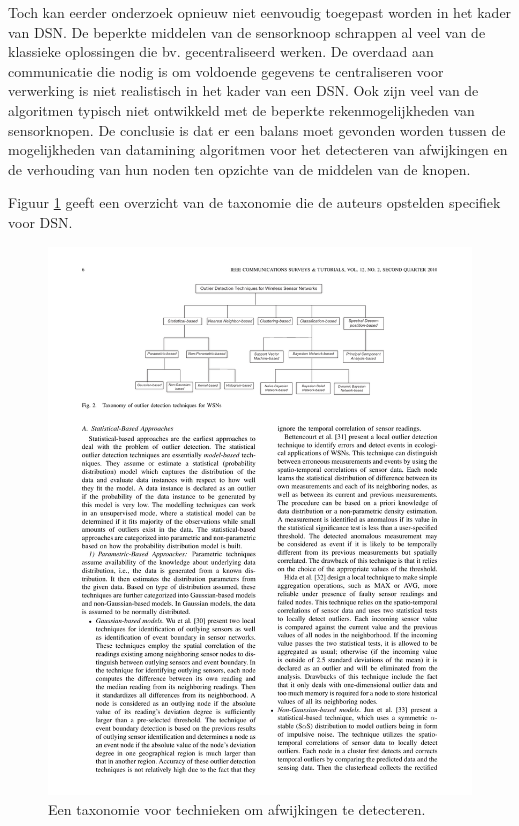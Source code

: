 Toch kan eerder onderzoek opnieuw niet eenvoudig toegepast worden in het kader
van DSN. De beperkte middelen van de sensorknoop schrappen al veel van de
klassieke oplossingen die bv. gecentraliseerd werken. De overdaad aan
communicatie die nodig is om voldoende gegevens te centraliseren voor
verwerking is niet realistisch in het kader van een DSN. Ook zijn veel van de
algoritmen typisch niet ontwikkeld met de beperkte rekenmogelijkheden van
sensorknopen. De conclusie is dat er een balans moet gevonden worden tussen de
mogelijkheden van datamining algoritmen voor het detecteren van afwijkingen en
de verhouding van hun noden ten opzichte van de middelen van de knopen.

Figuur \ref{fig:outlier-detection-taxonomy} geeft een overzicht van de
taxonomie die de auteurs opstelden specifiek voor DSN.

\begin{figure}[ht]
  \centering
  \includegraphics[width=\linewidth]{resources/outlier-detection-taxonomy.pdf}
  \caption[Taxonomie voor detectie van afwijkingen.]{Een taxonomie voor technieken om afwijkingen te detecteren. \citep{zhang2010outlier}}
  \label{fig:outlier-detection-taxonomy}
\end{figure}

